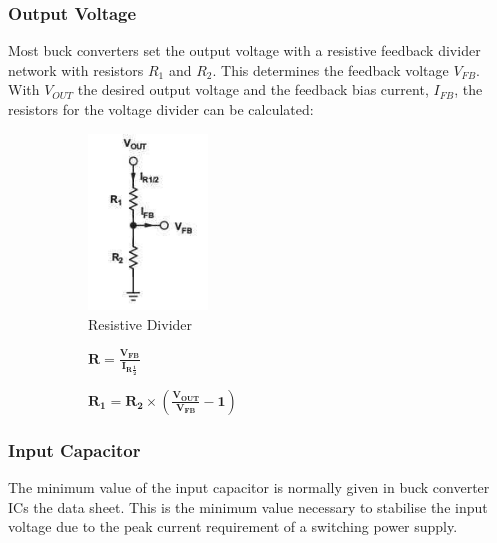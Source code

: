 \subsubsection{Output Voltage}
\vspace{-2mm}
Most buck converters set the output voltage with a resistive feedback divider network with resistors $R_1$ and $R_2$. This determines the feedback voltage $V_{FB}$. With $V_{OUT}$ the desired output voltage and the feedback bias current, $I_{FB}$, the resistors for the voltage divider can be calculated:
\begin{figure}[H]
  \begin{minipage}[b]{0.48\textwidth}
      \begin{figure}[H]
    \centering
    \includegraphics[width=0.35\textwidth]{Voltage_set.jpg}
    \caption{Resistive Divider}
    \end{figure}
  \end{minipage}
  \hfill
  \begin{minipage}[b]{0.48\textwidth}
    \begin{figure}[H]
    \hspace{10mm}
    $\mathbf{R = \frac{V_{FB}}{I_{R\frac{1}{2}}}}$ 
    \end{figure}
    \begin{figure}[H]
    \hspace{10mm}
    $\mathbf{R_1 = R_2 \times{( \frac{V_{OUT}}{V_{FB}} - 1)}}$ 
    \end{figure}
    \vspace{16mm}
  \end{minipage}
\end{figure}

\subsubsection{Input Capacitor}
\vspace{-2mm}
The minimum value of the input capacitor is normally given in buck converter ICs the data sheet. This is the minimum value necessary to stabilise the input voltage due to the peak current requirement of a switching power supply.

